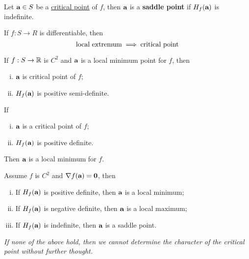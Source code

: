 \documentclass[11pt]{article}
\begin{document}
			\begin{definition}
				Let $\textbf{a} \in S$ be a \ul{critical point} of $f$, then $\textbf{a}$ is a \textbf{saddle point} if $H_f(\textbf{a})$ is indefinite.
			\end{definition}
			
			\begin{theorem}
				If $f: S \to R$ is differentiable, then 
				\begin{equation}
					\text{{local extremum}} \implies \text{{critical point}}
				\end{equation}
			\end{theorem}
			
			\begin{theorem}
				If $f: S \to \mathbb{R}$ is $C^2$ and $\textbf{a}$ is a local minimum point for $f$, then
				\begin{enumerate}[(i)]
					\item $\textbf{a}$ is critical point of $f$;
					\item $H_f(\textbf{a})$ is positive semi-definite.
				\end{enumerate}
			\end{theorem}
			
			\begin{theorem}
				If 
				\begin{enumerate}[(i)]
					\item $\textbf{a}$ is a critical point of $f$;
					\item $H_f(\textbf{a})$ is positive definite.
				\end{enumerate}
				Then $\textbf{a}$ is a local minimum for $f$.
			\end{theorem}
			
			\begin{corollary}
				Assume $f$ is $C^2$ and $\nabla f(\textbf{a}) = \textbf{0}$, then
				\begin{enumerate}[(i)]
					\item If $H_f(\textbf{a})$ is positive definite, then $\textbf{a}$ is a local minimum;
					\item If $H_f(\textbf{a})$ is negative definite, then $\textbf{a}$ is a local maximum;
					\item If $H_f(\textbf{a})$ is indefinite, then $\textbf{a}$ is a saddle point.
				\end{enumerate}
				\emph{If none of the above hold, then we cannot determine the character of the critical point without further thought.}
			\end{corollary}
			
\end{document}
